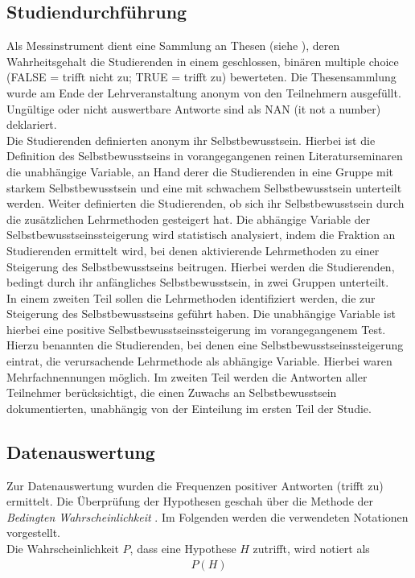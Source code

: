\subsection{Studiendurchführung}
Als Messinstrument dient eine Sammlung an Thesen (siehe ), deren Wahrheitsgehalt die Studierenden in einem geschlossen, binären multiple choice (FALSE = trifft nicht zu; TRUE = trifft zu) bewerteten. Die Thesensammlung wurde am Ende der Lehrveranstaltung anonym von den Teilnehmern ausgefüllt. Ungültige oder nicht auswertbare Antworte sind als NAN ({it not a number}) deklariert.\\
\noindent
Die Studierenden definierten anonym ihr Selbstbewusstsein. Hierbei ist die Definition des Selbstbewusstseins in vorangegangenen reinen Literaturseminaren die unabhängige Variable, an Hand derer die Studierenden in eine Gruppe mit starkem Selbstbewusstsein und eine mit schwachem Selbstbewusstsein unterteilt werden. Weiter definierten die Studierenden, ob sich ihr Selbstbewusstsein durch die zusätzlichen Lehrmethoden gesteigert hat. Die abhängige Variable der Selbstbewusstseinssteigerung wird statistisch analysiert, indem die Fraktion an Studierenden ermittelt wird, bei denen aktivierende Lehrmethoden zu einer Steigerung des Selbstbewusstseins beitrugen. Hierbei werden die Studierenden, bedingt durch ihr anfängliches Selbstbewusstsein, in zwei Gruppen unterteilt.\\
\noindent
In einem zweiten Teil sollen die Lehrmethoden identifiziert werden, die zur Steigerung des Selbstbewusstseins geführt haben. Die unabhängige Variable ist hierbei eine positive Selbstbewusstseinssteigerung im vorangegangenem Test. Hierzu benannten die Studierenden, bei denen eine Selbstbewusstseinssteigerung eintrat, die verursachende Lehrmethode als abhängige Variable. Hierbei waren Mehrfachnennungen möglich. Im zweiten Teil werden die Antworten aller Teilnehmer berücksichtigt, die einen Zuwachs an Selbstbewusstsein dokumentierten, unabhängig von der Einteilung im ersten Teil der Studie.

\subsection{Datenauswertung}
Zur Datenauswertung wurden die Frequenzen positiver Antworten (trifft zu) ermittelt. Die Überprüfung der Hypothesen geschah über die Methode der {\it Bedingten Wahrscheinlichkeit} \cite{Eddy.2004}. Im Folgenden werden die verwendeten Notationen vorgestellt.\\
\noindent
Die Wahrscheinlichkeit $P$, dass eine Hypothese $H$ zutrifft, wird notiert als
\begin{align}
	\label{eq:Prob1}
	P(H)
\end{align}

